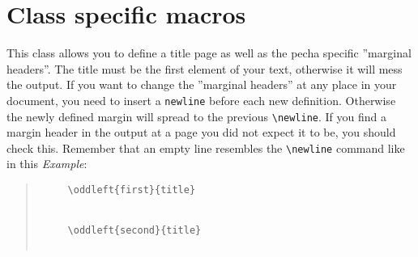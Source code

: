 \documentclass[a4paper,11pt]{article}
\begin{document}
\section{Class specific macros}
This class allows you to define a title page as well as the pecha specific ''marginal headers''. The title {\sc must} be the first element of your text, otherwise it will mess the output. If you want to change the ''marginal headers'' at any place in your document, you need to insert a \verb-newline- before each new definition. Otherwise the newly defined margin will spread to the previous \verb-\newline-. If you find a margin header in the output at a page you did not expect it to be, you should check this. Remember that an empty line resembles the \verb-\newline- command like in this
\emph{Example}:
\begin{quote}
   \begin{verbatim}
     \oddleft{first}{title}
     

     \oddleft{second}{title}
     
    \end{verbatim}
\end{quote}
\end{document}
